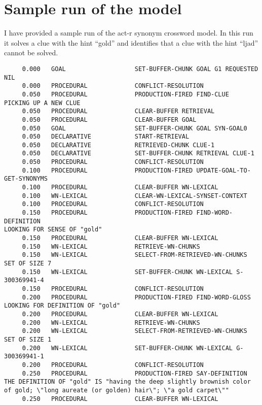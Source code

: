 \headsep 0.8in
\section{Sample run of the model}
I have provided a sample run of the act-r synonym crossword model. In this run it solves a clue with the hint ``gold'' and identifies that a clue with the hint ``ljad'' cannot be solved.

\begin{verbatim}
     0.000   GOAL                   SET-BUFFER-CHUNK GOAL G1 REQUESTED NIL 
     0.000   PROCEDURAL             CONFLICT-RESOLUTION 
     0.050   PROCEDURAL             PRODUCTION-FIRED FIND-CLUE 
PICKING UP A NEW CLUE 
     0.050   PROCEDURAL             CLEAR-BUFFER RETRIEVAL 
     0.050   PROCEDURAL             CLEAR-BUFFER GOAL 
     0.050   GOAL                   SET-BUFFER-CHUNK GOAL SYN-GOAL0 
     0.050   DECLARATIVE            START-RETRIEVAL 
     0.050   DECLARATIVE            RETRIEVED-CHUNK CLUE-1 
     0.050   DECLARATIVE            SET-BUFFER-CHUNK RETRIEVAL CLUE-1 
     0.050   PROCEDURAL             CONFLICT-RESOLUTION 
     0.100   PROCEDURAL             PRODUCTION-FIRED UPDATE-GOAL-TO-GET-SYNONYMS 
     0.100   PROCEDURAL             CLEAR-BUFFER WN-LEXICAL 
     0.100   WN-LEXICAL             CLEAR-WN-LEXICAL-SYNSET-CONTEXT 
     0.100   PROCEDURAL             CONFLICT-RESOLUTION 
     0.150   PROCEDURAL             PRODUCTION-FIRED FIND-WORD-DEFINITION 
LOOKING FOR SENSE OF "gold" 
     0.150   PROCEDURAL             CLEAR-BUFFER WN-LEXICAL 
     0.150   WN-LEXICAL             RETRIEVE-WN-CHUNKS 
     0.150   WN-LEXICAL             SELECT-FROM-RETRIEVED-WN-CHUNKS SET OF SIZE 7 
     0.150   WN-LEXICAL             SET-BUFFER-CHUNK WN-LEXICAL S-300369941-4 
     0.150   PROCEDURAL             CONFLICT-RESOLUTION 
     0.200   PROCEDURAL             PRODUCTION-FIRED FIND-WORD-GLOSS 
LOOKING FOR DEFINITION OF "gold" 
     0.200   PROCEDURAL             CLEAR-BUFFER WN-LEXICAL 
     0.200   WN-LEXICAL             RETRIEVE-WN-CHUNKS 
     0.200   WN-LEXICAL             SELECT-FROM-RETRIEVED-WN-CHUNKS SET OF SIZE 1 
     0.200   WN-LEXICAL             SET-BUFFER-CHUNK WN-LEXICAL G-300369941-1 
     0.200   PROCEDURAL             CONFLICT-RESOLUTION 
     0.250   PROCEDURAL             PRODUCTION-FIRED SAY-DEFINITION 
THE DEFINITION OF "gold" IS "having the deep slightly brownish color of gold; \"long aureate (or golden) hair\"; \"a gold carpet\"" 
     0.250   PROCEDURAL             CLEAR-BUFFER WN-LEXICAL 

\end{verbatim}
